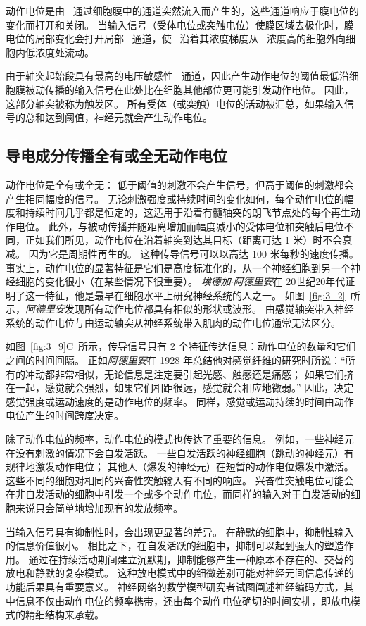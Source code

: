 动作电位是由~ 通过细胞膜中的通道突然流入而产生的，这些通道响应于膜电位的变化而打开和关闭。
当输入信号（受体电位或突触电位）使膜区域去极化时，膜电位的局部变化会打开局部~ 通道，使~ 沿着其浓度梯度从~ 浓度高的细胞外向细胞内低浓度处流动。


由于轴突起始段具有最高的电压敏感性~ 通道，因此产生动作电位的阈值最低沿细胞膜被动传播的输入信号在此处比在细胞其他部位更可能引发动作电位。
因此，这部分轴突被称为触发区。
所有受体（或突触）电位的活动被汇总，如果输入信号的总和达到阈值，神经元就会产生动作电位。


\subsection{导电成分传播全有或全无动作电位}
动作电位是全有或全无：
低于阈值的刺激不会产生信号，但高于阈值的刺激都会产生相同幅度的信号。
无论刺激强度或持续时间的变化如何，每个动作电位的幅度和持续时间几乎都是恒定的，这适用于沿着有髓轴突的朗飞节点处的每个再生动作电位。
此外，与被动传播并随距离增加而幅度减小的受体电位和突触后电位不同，正如我们所见，动作电位在沿着轴突到达其目标（距离可达 1 米）时不会衰减。 
因为它是周期性再生的。
这种传导信号可以以高达 100 米每秒的速度传播。
事实上，动作电位的显著特征是它们是高度标准化的，从一个神经细胞到另一个神经细胞的变化很小（在某些情况下很重要）。
\textit{埃德加$\cdot$阿德里安}在 20世纪20年代证明了这一特征，他是最早在细胞水平上研究神经系统的人之一。
如图~\ref{fig:3_2}~所示，\textit{阿德里安}发现所有动作电位都具有相似的形状或波形。
由感觉轴突带入神经系统的动作电位与由运动轴突从神经系统带入肌肉的动作电位通常无法区分。


如图~\ref{fig:3_9}C~所示，传导信号只有 2 个特征传达信息：动作电位的数量和它们之间的时间间隔。
正如\textit{阿德里安}在 1928 年总结他对感觉纤维的研究时所说：“所有的冲动都非常相似，无论信息是注定要引起光感、触感还是痛感；
如果它们挤在一起，感觉就会强烈，如果它们相距很远，感觉就会相应地微弱。” 
因此，决定感觉强度或运动速度的是动作电位的频率。
同样，感觉或运动持续的时间由动作电位产生的时间跨度决定。


除了动作电位的频率，动作电位的模式也传达了重要的信息。
例如，一些神经元在没有刺激的情况下会自发活跃。
一些自发活跃的神经细胞（跳动的神经元）有规律地激发动作电位；
其他人（爆发的神经元）在短暂的动作电位爆发中激活。
这些不同的细胞对相同的兴奋性突触输入有不同的响应。
兴奋性突触电位可能会在非自发活动的细胞中引发一个或多个动作电位，而同样的输入对于自发活动的细胞来说只会简单地增加现有的发放频率。


当输入信号具有抑制性时，会出现更显著的差异。
在静默的细胞中，抑制性输入的信息价值很小。 
相比之下，在自发活跃的细胞中，抑制可以起到强大的塑造作用。
通过在持续活动期间建立沉默期，抑制能够产生一种原本不存在的、交替的放电和静默的复杂模式。
这种放电模式中的细微差别可能对神经元间信息传递的功能后果具有重要意义。
神经网络的数学模型研究者试图阐述神经编码方式，其中信息不仅由动作电位的频率携带，还由每个动作电位确切的时间安排，即放电模式的精细结构来承载。


